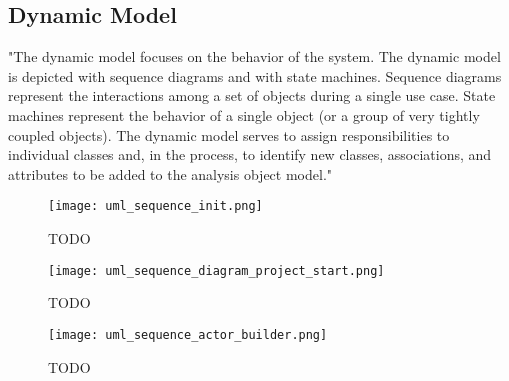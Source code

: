\subsection{Dynamic Model}
"The dynamic model focuses on the behavior of the system. The dynamic model is
depicted with sequence diagrams and with state machines. Sequence diagrams represent the
interactions among a set of objects during a single use case. State machines represent the
behavior of a single object (or a group of very tightly coupled objects). The dynamic model
serves to assign responsibilities to individual classes and, in the process, to identify new classes,
associations, and attributes to be added to the analysis object model."


\begin{figure}[h]
    \begin{adjustwidth}{-0.2\paperwidth}{-0.2\paperwidth}
        \centering
        \texttt{[image: uml\_sequence\_init.png]}
        \caption{TODO}
        \label{fig:uml_sequence_init}
    \end{adjustwidth}
\end{figure}

\begin{figure}[h]
    \begin{adjustwidth}{-0.2\paperwidth}{-0.2\paperwidth}
        \centering
        \texttt{[image: uml\_sequence\_diagram\_project\_start.png]}
        \caption{TODO}
        \label{fig:uml_sequence_project_start}
    \end{adjustwidth}
\end{figure}

\begin{figure}[h]
    \begin{adjustwidth}{-0.2\paperwidth}{-0.2\paperwidth}
        \centering
        \texttt{[image: uml\_sequence\_actor\_builder.png]}
        \caption{TODO}
        \label{fig:uml_sequence_project_start}
    \end{adjustwidth}
\end{figure}